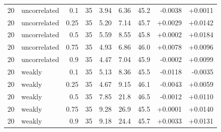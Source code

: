 \begin{tabular}{rlrrrrrrr}
20 & uncorrelated & 0.1 & 35 & 3.94 & 6.36 & 45.2 & -0.0038 & +0.0011 \\
20 & uncorrelated & 0.25 & 35 & 5.20 & 7.14 & 45.7 & +0.0029 & +0.0142 \\
20 & uncorrelated & 0.5 & 35 & 5.59 & 8.55 & 45.8 & +0.0002 & +0.0184 \\
20 & uncorrelated & 0.75 & 35 & 4.93 & 6.86 & 46.0 & +0.0078 & +0.0096 \\
20 & uncorrelated & 0.9 & 35 & 4.47 & 7.04 & 45.9 & -0.0002 & +0.0099 \\
20 & weakly & 0.1 & 35 & 5.13 & 8.36 & 45.5 & -0.0118 & -0.0035 \\
20 & weakly & 0.25 & 35 & 4.67 & 9.15 & 46.1 & -0.0043 & +0.0059 \\
20 & weakly & 0.5 & 35 & 7.85 & 21.8 & 46.5 & -0.0012 & +0.0110 \\
20 & weakly & 0.75 & 35 & 9.28 & 26.9 & 45.5 & +0.0001 & +0.0140 \\
20 & weakly & 0.9 & 35 & 9.18 & 24.4 & 45.7 & +0.0033 & +0.0131 \\
\hline
\end{tabular}
